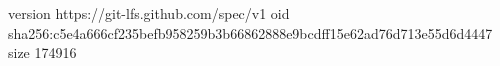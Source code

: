 version https://git-lfs.github.com/spec/v1
oid sha256:c5e4a666cf235befb958259b3b66862888e9bcdff15e62ad76d713e55d6d4447
size 174916
